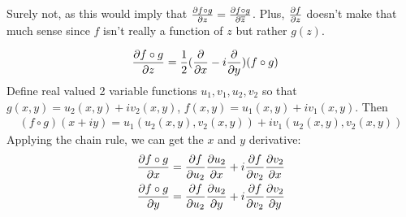 \documentclass{homework}
\begin{document}
                                                                                                             \begin{solution}
                                                                                                             Surely not, as this would imply that $\frac{\partial f\circ g}{\partial z} = \frac{\partial f\circ g}{\partial \overline{z}}$. Plus, $\frac{\partial f}{\partial z}$ doesn't make that much sense since $f$ isn't really a function of $z$ but rather $g(z)$.

                                                                                                             \begin{align*}
                                                                                                             \frac{\partial f\circ g}{\partial z} &= \frac{1}{2}(\frac{\partial }{\partial x} - i\frac{\partial }{\partial y})(f\circ g)
                                                                                                             \end{align*}
                                                                                                             Define real valued 2 variable functions $u_1, v_1, u_2, v_2$ so that $g(x,y) = u_2(x,y) + iv_2(x,y)$, $f(x, y) = u_1(x, y) + iv_1(x, y)$. Then 
                                                                                                             \begin{align*}
                                                                                                             (f\circ g)(x+iy) = u_1(u_2(x, y), v_2(x, y)) + iv_1(u_2(x, y), v_2(x, y))
                                                                                                             \end{align*}
                                                                                                             Applying the chain rule, we can get the $x$ and $y$ derivative:
                                                                                                             \begin{align*}
                                                                                                             \frac{\partial f\circ g}{\partial x} &= \frac{\partial f}{\partial u_2}\frac{\partial u_2}{\partial x} + i\frac{\partial f}{\partial v_2}\frac{\partial v_2}{\partial x}\\
                                                                                                             \frac{\partial f\circ g}{\partial y} &= \frac{\partial f}{\partial u_2}\frac{\partial u_2}{\partial y} + i\frac{\partial f}{\partial v_2}\frac{\partial v_2}{\partial y}
                                                                                                             \end{align*}

\end{solution}
\end{document}
